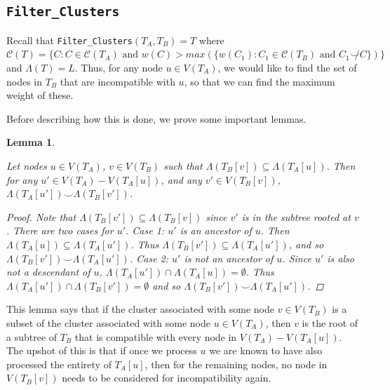 \documentclass{article}
\newcommand{\compatible}{\smile}
\newcommand{\leafset}{\Lambda}
\newtheorem{filterclusterssubsetcompatible}[incompatibility]{Lemma}
\begin{document}
    \subsection{\texttt{Filter\_Clusters}}

    Recall that \texttt{Filter\_Clusters}$(T_A, T_B) = T$ where $\mathcal{C}(T) = \{C : C \in \mathcal{C}(T_A) \text{ and } w(C) > max(\{w(C_1) : C_1 \in \mathcal{C}(T_B) \text{ and } C_1 \not\compatible C\})\}$ and $\leafset(T) = L$. Thus, for any node $u \in V(T_A)$, we would like to find the set of nodes in $T_B$ that are incompatible with $u$, so that we can find the maximum weight of these.

    Before describing how this is done, we prove some important lemmas.
    \newline

    \begin{filterclusterssubsetcompatible}
        \label{lem:filterclusterssubsetcompatible}

        Let nodes $u \in V(T_A)$, $v \in V(T_B)$ such that $\leafset(T_B[v]) \subseteq \leafset(T_A[u])$. Then for any $u' \in V(T_A) - V(T_A[u])$, and any $v' \in V(T_B[v])$, $\leafset(T_A[u']) \compatible \leafset(T_B[v'])$.

        \begin{proof}
            Note that $\leafset(T_B[v']) \subseteq \leafset(T_B[v])$ since $v'$ is in the subtree rooted at $v$. There are two cases for $u'$. \textit{Case 1}: $u'$ is an ancestor of $u$. Then $\leafset(T_A[u]) \subseteq \leafset(T_A[u'])$. Thus $\leafset(T_B[v']) \subseteq \leafset(T_A[u'])$, and so $\leafset(T_B[v']) \compatible \leafset(T_A[u'])$. \textit{Case 2}: $u'$ is not an ancestor of $u$. Since $u'$ is also not a descendant of $u$, $\leafset(T_A[u']) \cap \leafset(T_A[u]) = \emptyset$. Thus $\leafset(T_A[u']) \cap \leafset(T_B[v']) = \emptyset$ and so $\leafset(T_B[v']) \compatible \leafset(T_A[u'])$.
        \end{proof}
    \end{filterclusterssubsetcompatible}

    This lemma says that if the cluster associated with some node $v \in V(T_B)$ is a subset of the cluster associated with some node $u \in V(T_A)$, then $v$ is the root of a subtree of $T_B$ that is compatible with every node in $V(T_A) - V(T_A[u])$. The upshot of this is that if once we process $u$ we are known to have also processed the entirety of $T_A[u]$, then for the remaining nodes, no node in $V(T_B[v])$ needs to be considered for incompatibility again.
\end{document}
